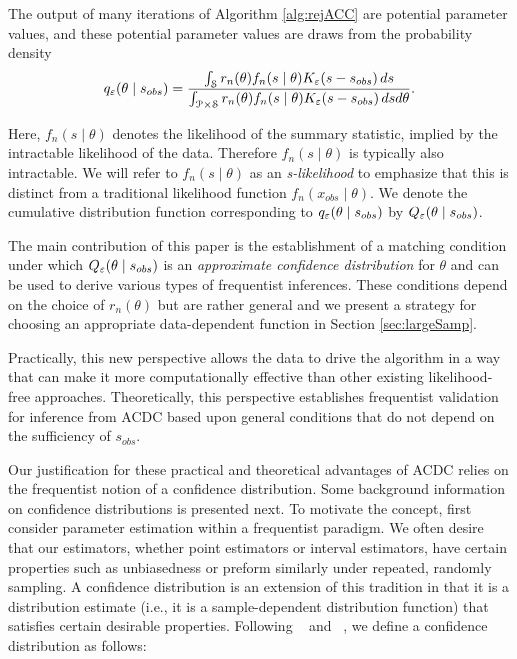 \vspace{-6mm}

\noindent
\hrulefill
\vspace{2mm}

The output of many iterations of Algorithm \ref{alg:rejACC} are potential parameter values, and  
these potential parameter values are draws from the probability density 
\begin{align} 
	q_{\varepsilon}(\theta\mid s_{\relax obs})=
	\frac{\int_{ \cal S}r_{n}(\theta)f_n(s\mid\theta)K_{\varepsilon}(s - s_{\relax obs})\,ds}{\int_{{\cal P} \times{\cal S}}r_{n}(\theta)f_n(s\mid\theta)K_{\varepsilon}(s - s_{\relax obs})\,ds d\theta}.
\label{ACC_dist}
\end{align}

Here, $f_n (  s \mid\theta)$ denotes the likelihood of the summary statistic, implied by the intractable likelihood of the data. Therefore $f_n (  s \mid\theta)$ is typically also intractable. We will refer to $f_n ( s \mid\theta)$ as an {\it s-likelihood} to emphasize that this is distinct from a traditional likelihood function $f_n (x_{obs} \mid\theta)$. We denote the cumulative distribution function corresponding to $q_{\varepsilon}(\theta\mid s_{\relax obs})$ by $Q_{\varepsilon}(\theta\mid s_{\relax obs})$. 

The main contribution of this paper is the establishment of a matching condition under which $Q_{\varepsilon}(\theta\mid s_{\relax obs})$ is
an {\it approximate confidence distribution} for $\theta$ and can be used to derive various types of frequentist inferences. These conditions depend on the choice of $r_{n}(\theta)$ but are rather general and we present a strategy for choosing an appropriate data-dependent function in Section \ref{sec:largeSamp}. 

Practically, this new perspective allows the data to drive the algorithm in a way that can make it  more computationally effective than other existing likelihood-free approaches. Theoretically, this perspective establishes frequentist validation for inference from ACDC based upon general conditions that do not depend on the sufficiency of $s_{obs}$. 

Our justification for these practical and theoretical advantages of ACDC relies on the frequentist notion of a confidence distribution. Some background information on confidence distributions is presented next. To motivate the concept, first consider parameter estimation within a frequentist paradigm. We often desire that our estimators, whether point estimators or interval estimators, have certain properties such as unbiasedness or preform similarly under repeated, randomly sampling. A confidence distribution is an extension of this tradition in that it is a distribution estimate (i.e., it is a sample-dependent distribution function) that satisfies certain desirable properties. Following ~\cite{Xie2013} and ~\cite{Schweder2016}, we define a confidence distribution as follows:
	
